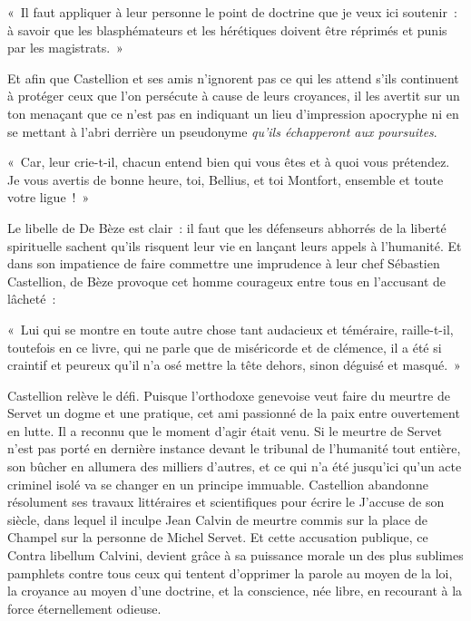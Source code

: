 \documentclass[french,twoside]{book} %
\newcommand{\astermono}{\medskip\centerline{\color{rubric}\large\selectfont{\syms ✻}}\medskip\par}%
\newenvironment{quoteblock}%
  {\begin{quoting}}
  {\end{quoting}}
\newenvironment{quotebar}{%
    \def\FrameCommand{{\color{rubric!10!}\vrule width 0.5em} \hspace{0.9em}}%
    \def\OuterFrameSep{2pt} %
    \MakeFramed {\advance\hsize-\width \FrameRestore}
  }%
  {%
    \endMakeFramed
  }
\renewenvironment{quoteblock}%
  {%
    \savenotes
    \setstretch{0.9}
    \normalfont
    \begin{quotebar}
  }
  {%
    \end{quotebar}
    \spewnotes
  }
\begin{document}
\begin{quoteblock}
\noindent « Il faut appliquer à leur personne le point de doctrine que je veux ici soutenir : à savoir que les blasphémateurs et les hérétiques doivent être réprimés et punis par les magistrats. »\end{quoteblock}

\noindent Et afin que Castellion et ses amis n’ignorent pas ce qui les attend s’ils continuent à protéger ceux que l’on persécute à cause de leurs croyances, il les avertit sur un ton menaçant que ce n’est pas en indiquant un lieu d’impression apocryphe ni en se mettant à l’abri derrière un pseudonyme \emph{qu’ils échapperont aux poursuites}.\par

\begin{quoteblock}
\noindent « Car, leur crie-t-il, chacun entend bien qui vous êtes et à quoi vous prétendez. Je vous avertis de bonne heure, toi, Bellius, et toi Montfort, ensemble et toute votre ligue ! »\end{quoteblock}


\astermono

\noindent Le libelle de De Bèze est clair : il faut que les défenseurs abhorrés de la liberté spirituelle sachent qu’ils risquent leur vie en lançant leurs appels à l’humanité. Et dans son impatience de faire commettre une imprudence à leur chef Sébastien Castellion, de Bèze provoque cet homme courageux entre tous en l’accusant de lâcheté :\par

\begin{quoteblock}
\noindent « Lui qui se montre en toute autre chose tant audacieux et téméraire, raille-t-il, toutefois en ce livre, qui ne parle que de miséricorde et de clémence, il a été si craintif et peureux qu’il n’a osé mettre la tête dehors, sinon déguisé et masqué. »\end{quoteblock}

\noindent Castellion relève le défi. Puisque l’orthodoxe genevoise veut faire du meurtre de Servet un dogme et une pratique, cet ami passionné de la paix entre ouvertement en lutte. Il a reconnu que le moment d’agir était venu. Si le meurtre de Servet n’est pas porté en dernière instance devant le tribunal de l’humanité tout entière, son bûcher en allumera des milliers d’autres, et ce qui n’a été jusqu’ici qu’un acte criminel isolé va se changer en un principe immuable. Castellion abandonne résolument ses travaux littéraires et scientifiques pour écrire le J’accuse de son siècle, dans lequel il inculpe Jean Calvin de meurtre commis sur la place de Champel sur la personne de Michel Servet. Et cette accusation publique, ce Contra libellum Calvini, devient grâce à sa puissance morale un des plus sublimes pamphlets contre tous ceux qui tentent d’opprimer la parole au moyen de la loi, la croyance au moyen d’une doctrine, et la conscience, née libre, en recourant à la force éternellement odieuse.\par
\end{document}
